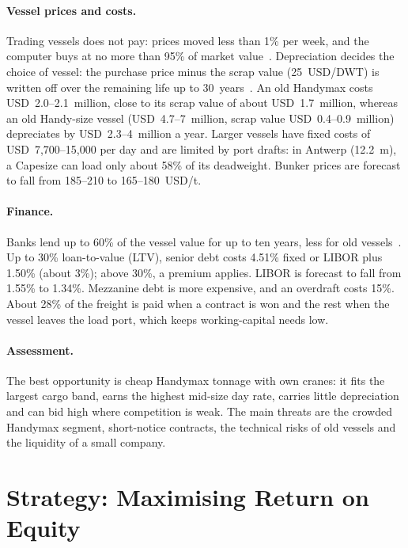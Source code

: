 \paragraph{Vessel prices and costs.} Trading vessels does not pay: prices moved less than 1\% per week, and the computer buys at no more than 95\% of market value~\cite{MBGrefmanual}. Depreciation decides the choice of vessel: the purchase price minus the scrap value (25~USD/DWT) is written off over the remaining life up to 30~years~\cite{MBGrefmanual}. An old Handymax costs USD~2.0--2.1~million, close to its scrap value of about USD~1.7~million, whereas an old Handy-size vessel (USD~4.7--7~million, scrap value USD~0.4--0.9~million) depreciates by USD~2.3--4~million a year. Larger vessels have fixed costs of USD~7,700--15,000 per day and are limited by port drafts: in Antwerp (12.2~m), a Capesize can load only about 58\% of its deadweight. Bunker prices are forecast to fall from 185--210 to 165--180~USD/t.

\paragraph{Finance.} Banks lend up to 60\% of the vessel value for up to ten years, less for old vessels~\cite{MBGrefmanual}. Up to 30\% loan-to-value (LTV), senior debt costs 4.51\% fixed or LIBOR plus 1.50\% (about 3\%); above 30\%, a premium applies. LIBOR is forecast to fall from 1.55\% to 1.34\%. Mezzanine debt is more expensive, and an overdraft costs 15\%. About 28\% of the freight is paid when a contract is won and the rest when the vessel leaves the load port, which keeps working-capital needs low.

\paragraph{Assessment.} The best opportunity is cheap Handymax tonnage with own cranes: it fits the largest cargo band, earns the highest mid-size day rate, carries little depreciation and can bid high where competition is weak. The main threats are the crowded Handymax segment, short-notice contracts, the technical risks of old vessels and the liquidity of a small company.

\section{Strategy: Maximising Return on Equity}\label{sec:strategy}

